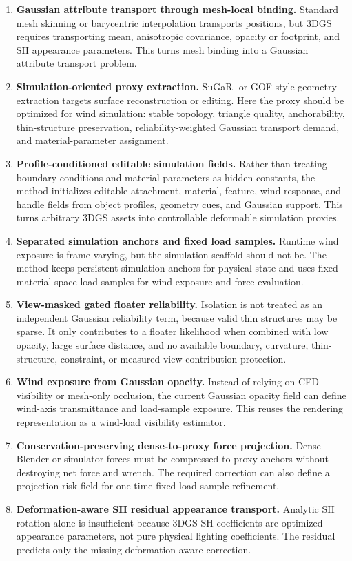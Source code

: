\documentclass[11pt]{article}
\begin{document}
\begin{enumerate}
  \item \textbf{Gaussian attribute transport through mesh-local binding.}
  Standard mesh skinning or barycentric interpolation transports positions, but 3DGS requires transporting mean, anisotropic covariance, opacity or footprint, and SH appearance parameters. This turns mesh binding into a Gaussian attribute transport problem.
  \item \textbf{Simulation-oriented proxy extraction.}
  SuGaR- or GOF-style geometry extraction targets surface reconstruction or editing. Here the proxy should be optimized for wind simulation: stable topology, triangle quality, anchorability, thin-structure preservation, reliability-weighted Gaussian transport demand, and material-parameter assignment.
  \item \textbf{Profile-conditioned editable simulation fields.}
  Rather than treating boundary conditions and material parameters as hidden constants, the method initializes editable attachment, material, feature, wind-response, and handle fields from object profiles, geometry cues, and Gaussian support. This turns arbitrary 3DGS assets into controllable deformable simulation proxies.
  \item \textbf{Separated simulation anchors and fixed load samples.}
  Runtime wind exposure is frame-varying, but the simulation scaffold should not be. The method keeps persistent simulation anchors for physical state and uses fixed material-space load samples for wind exposure and force evaluation.
  \item \textbf{View-masked gated floater reliability.}
  Isolation is not treated as an independent Gaussian reliability term, because valid thin structures may be sparse. It only contributes to a floater likelihood when combined with low opacity, large surface distance, and no available boundary, curvature, thin-structure, constraint, or measured view-contribution protection.
  \item \textbf{Wind exposure from Gaussian opacity.}
  Instead of relying on CFD visibility or mesh-only occlusion, the current Gaussian opacity field can define wind-axis transmittance and load-sample exposure. This reuses the rendering representation as a wind-load visibility estimator.
  \item \textbf{Conservation-preserving dense-to-proxy force projection.}
  Dense Blender or simulator forces must be compressed to proxy anchors without destroying net force and wrench. The required correction can also define a projection-risk field for one-time fixed load-sample refinement.
  \item \textbf{Deformation-aware SH residual appearance transport.}
  Analytic SH rotation alone is insufficient because 3DGS SH coefficients are optimized appearance parameters, not pure physical lighting coefficients. The residual predicts only the missing deformation-aware correction.
\end{enumerate}
\end{document}
